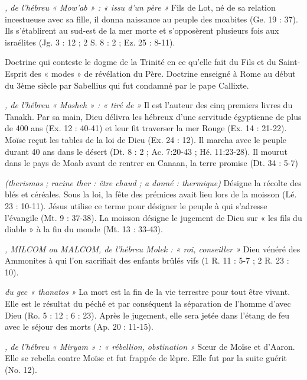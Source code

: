 \begin{multicols}{2}
\textit{, de l'hébreu « Mow'ab » : « issu d'un père »}\newline
Fils de Lot, né de sa relation incestueuse avec sa fille, il donna naissance au peuple des moabites (Ge. 19 : 37). Ils s'établirent au sud-est de la mer morte et s'opposèrent plusieurs fois aux israélites (Jg. 3 : 12 ; 2 S. 8 : 2 ; Ez. 25 : 8-11).

\textit{}\newline
Doctrine qui conteste le dogme de la Trinité en ce qu'elle fait du Fils et du Saint-Esprit des « modes » de révélation du Père. Doctrine enseigné à Rome au début du 3ème siècle par Sabellius qui fut condamné par le pape Callixte.

\textit{, de l'hébreu « Mosheh » : « tiré de »}\newline
Il est l'auteur des cinq premiers livres du Tanakh.
Par sa main, Dieu délivra les hébreux d'une servitude égyptienne de plus de 400 ans (Ex. 12 : 40-41) et leur fit traverser la mer Rouge (Ex. 14 : 21-22). Moïse reçut les tables de la loi de Dieu (Ex. 24 : 12). Il marcha avec le peuple durant 40 ans dans le désert (Dt. 8 : 2 ; Ac. 7:20-43 ; Hé. 11:23-28). Il mourut dans le pays de Moab avant de rentrer en Canaan, la terre promise (Dt. 34 : 5-7)

\textit{(therismos ; racine ther : être chaud ; a donné : thermique)}\newline
Désigne la récolte des blés et céréales. Sous la loi, la fête des prémices avait lieu lors de la moisson (Lé. 23 : 10-11). Jésus utilise ce terme pour désigner le peuple à qui s'adresse l'évangile (Mt. 9 : 37-38). La moisson désigne le jugement de Dieu sur « les fils du diable » à la fin du monde (Mt. 13 : 33-43).

\textit{, MILCOM ou MALCOM, de l'hébreu Molek : « roi, conseiller »}\newline
Dieu vénéré des Ammonites à qui l'on sacrifiait des enfants brûlés vifs (1 R. 11 : 5-7 ; 2 R. 23 : 10).

\textit{du gec « thanatos »}\newline
La mort est la fin de la vie terrestre pour tout être vivant. Elle est le résultat du péché et par conséquent la séparation de l'homme d'avec Dieu (Ro. 5 : 12 ; 6 : 23). Après le jugement, elle sera jetée dans l'étang de feu avec le séjour des morts (Ap. 20 : 11-15).

\textit{, de l'hébreu « Miryam » : « rébellion, obstination »}\newline
Sœur de Moïse et d'Aaron. Elle se rebella contre Moïse et fut frappée de lèpre. Elle fut par la suite guérit (No. 12).


\end{multicols}
